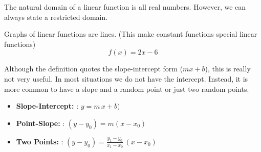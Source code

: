 \documentclass{ximera}
\begin{document}
The natural domain of a linear function is all real numbers.  However, we can always state a restricted domain.







Graphs of linear functions are lines. 
(This make constant functions special linear functions)
\[ f(x) = 2x - 6\]





\begin{image}
\end{image}






Although the definition quotes the slope-intercept form ($m x + b$), this is really not very useful.  In most situations we do not have the intercept.  Instead, it is more common to have a slope and a random point or just two random points.



\begin{itemize}
\item \textbf{\textcolor{blue!55!black}{Slope-Intercept:}}  : $y = m \, x + b)$
\item \textbf{\textcolor{blue!55!black}{Point-Slope:}}  : $(y - y_0) = m (x - x_0)$
\item \textbf{\textcolor{blue!55!black}{Two Points:}}  : $(y - y_0) = \frac{y_1 - y_0}{x_1 - x_0} \, (x - x_0)$

\end{itemize}
\end{document}
